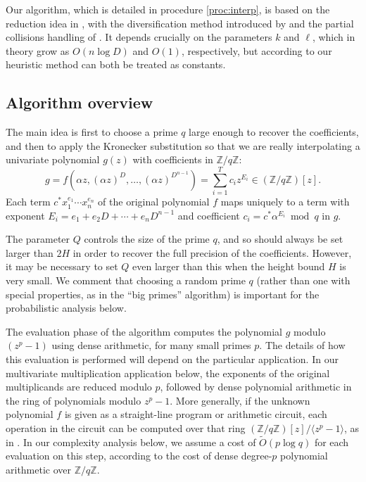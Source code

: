 \documentclass[letterpaper,10pt]{article}
\def\cite{\citep}
\newcommand{\ZZ}{\ensuremath{\mathbb{Z}}}
\newcommand{\softoh}{\ensuremath{\widetilde{O}}}
\begin{document}
Our algorithm, which is detailed in procedure \ref{proc:interp},
is based on the reduction idea in \cite{GS09}, with the
diversification method introduced by \cite{GR11a} and the partial
collisions handling of \cite{AGR13}. It depends crucially on the
parameters $k$ and $\ell$, which in theory grow as $O(n\log D)$ and
$O(1)$, respectively, but according to our heuristic method can both be
treated as constants.

\subsection{Algorithm overview}

The main idea is first to choose a prime $q$ large enough to recover the
coefficients, and then to apply the Kronecker substitution so that we
are really interpolating a univariate polynomial $g(z)$
with coefficients in $\ZZ/q\ZZ$:
\[g = f(\alpha z,(\alpha z)^D,\ldots,(\alpha z)^{D^{n-1}})
= \sum_{i=1}^T c_i z^{E_i} \in (\ZZ/q\ZZ)[z].\]
Each term $c^*x_1^{e_1}\cdots x_n^{e_n}$ of the original polynomial $f$
maps uniquely to a term with exponent
$E_i = e_1 + e_2 D + \cdots + e_n D^{n-1}$ and coefficient
$c_i = c^*\alpha^{E_i} \bmod q$ in $g$.

The parameter $Q$ controls the size of the prime $q$, and so should
always be set larger than $2H$ in order to recover the full precision of
the coefficients. However, it may be necessary to set $Q$ even larger
than this when the height bound $H$ is very small. We comment that
choosing a random prime $q$ (rather than one with special properties, as
in the ``big primes'' algorithm) is important for the probabilistic
analysis below.

The evaluation phase of the algorithm computes the polynomial
$g$ modulo $(z^p-1)$ using
dense arithmetic, for many small primes $p$. The details of 
how this evaluation is performed
will depend on the particular application. In our
multivariate multiplication application below, the exponents of the
original multiplicands are reduced modulo $p$, followed by dense
polynomial arithmetic in the ring of polynomials modulo $z^p-1$. More
generally, if the unknown polynomial $f$ is given as a straight-line
program or arithmetic circuit, each operation in the circuit can be
computed over that ring $(\ZZ/q\ZZ)[z]/\langle z^p-1\rangle$, as in
\cite{GS09}. In our complexity analysis below, we assume a cost of
$\softoh(p\log q)$ for each evaluation on
this step, according to the cost of dense
degree-$p$ polynomial arithmetic over $\ZZ/q\ZZ$.
\end{document}
